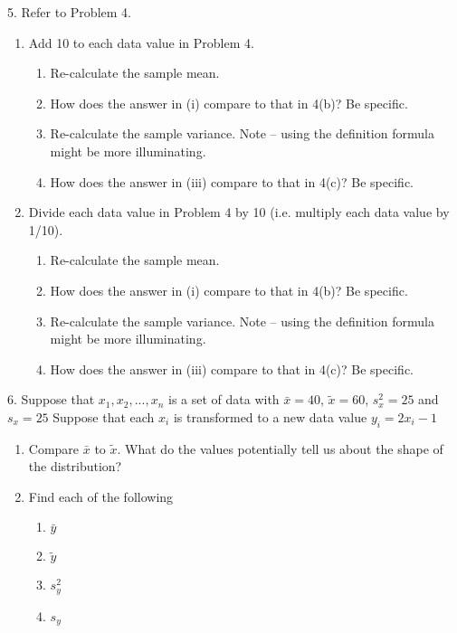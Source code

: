 \documentclass{report}
\begin{document}
    \pagebreak 
    \begin{mdframed}
       5.  Refer to Problem 4.
       \begin{enumerate}[label=(\alph*)]
           \item Add 10 to each data value in Problem 4.
           \begin{enumerate}[label=(\roman*)]
               \item Re-calculate the sample mean. 
               \item How does the answer in (i) compare to that in 4(b)? Be specific. 
               \item Re-calculate the sample variance. Note – using the definition formula might be more illuminating. 
               \item How does the answer in (iii) compare to that in 4(c)? Be specific. 
           \end{enumerate}
       \item Divide each data value in Problem 4 by 10 (i.e. multiply each data value by 1/10).
           \begin{enumerate}[label=(\roman*)]
               \item  Re-calculate the sample mean. 
               \item How does the answer in (i) compare to that in 4(b)? Be specific. 
               \item Re-calculate the sample variance. Note – using the definition formula might be more illuminating. 
               \item How does the answer in (iii) compare to that in 4(c)? Be specific. 
           \end{enumerate}
       \end{enumerate}
    \end{mdframed}

    \pagebreak 
    \begin{mdframed}
        6. Suppose that $x_{1}, x_{2}, ..., x_{n}$ is a set of data with $\bar{x}= 40$, $\tilde{x} = 60$, $s_{x}^{2} = 25$ and $s_{x} = 25 $
        Suppose that each $x_{i}$
        is transformed to a new data value $y_{i} = 2x_{i} - 1$
        \begin{enumerate}[label=(\alph*)]
            \item Compare $\bar{x}$ to $\tilde{x}$. What do the values potentially tell us about the shape of the distribution? 
            \item Find each of the following
                \begin{enumerate}[label=(\roman*)]
                    \item $\bar{y}$ 
                    \item $\tilde{y}$
                    \item $s_{y}^{2}$
                    \item $s_{y}$
                \end{enumerate}
        \end{enumerate}
    \end{mdframed}


 
\end{document}
